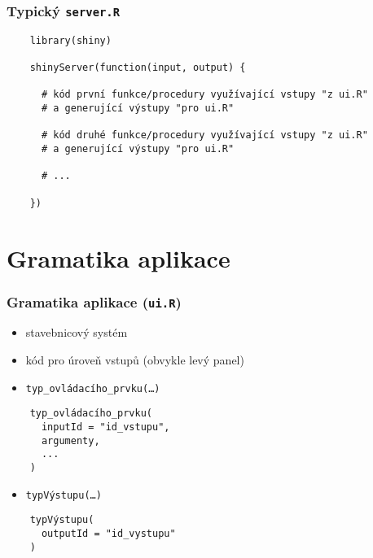 \documentclass[t]{beamer}
\begin{document}

\begin{frame}[fragile]
  \frametitle{Typický \texttt{server.R}}
  \begin{lstlisting}
    library(shiny)

    shinyServer(function(input, output) {
   
      # kód první funkce/procedury využívající vstupy "z ui.R"
      # a generující výstupy "pro ui.R"
  
      # kód druhé funkce/procedury využívající vstupy "z ui.R"
      # a generující výstupy "pro ui.R"
  
      # ...
  
    })
  \end{lstlisting}
\end{frame}



\section{Gramatika aplikace}


\begin{frame}[fragile]
  \frametitle{Gramatika aplikace (\texttt{ui.R})}
  \begin{itemize}
    \item stavebnicový systém
    \item kód pro úroveň vstupů (obvykle levý panel)
    \item \texttt{typ\_ovládacího\_prvku(\ldots)}
  \end{itemize}
  \begin{lstlisting}
    typ_ovládacího_prvku(
      inputId = "id_vstupu",
      argumenty,
      ...
    )
  \end{lstlisting}
  \begin{itemize}
    \item \texttt{typVýstupu(\ldots)}
  \end{itemize}
  \begin{lstlisting}
    typVýstupu(
      outputId = "id_vystupu"
    )
  \end{lstlisting}
\end{frame}
\end{document}

